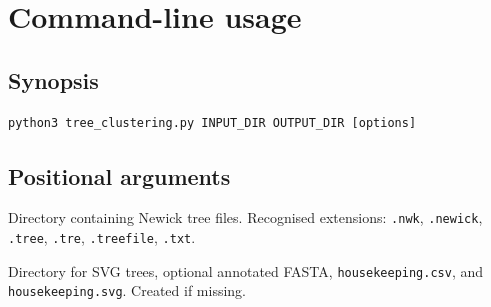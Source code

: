 \documentclass[11pt,a4paper]{article}
\begin{document}
\section{Command-line usage}

\subsection{Synopsis}
\begin{lstlisting}
python3 tree_clustering.py INPUT_DIR OUTPUT_DIR [options]
\end{lstlisting}

\subsection{Positional arguments}
\begin{description}[style=nextline,leftmargin=2.2cm,labelwidth=2cm]
  \item[\texttt{INPUT\_DIR}]
    Directory containing Newick tree files.
    Recognised extensions:
    \texttt{.nwk}, \texttt{.newick}, \texttt{.tree}, \texttt{.tre},
    \texttt{.treefile}, \texttt{.txt}.
  \item[\texttt{OUTPUT\_DIR}]
    Directory for SVG trees, optional annotated FASTA,
    \texttt{housekeeping.csv}, and \texttt{housekeeping.svg}.
    Created if missing.
\end{description}
\end{document}
